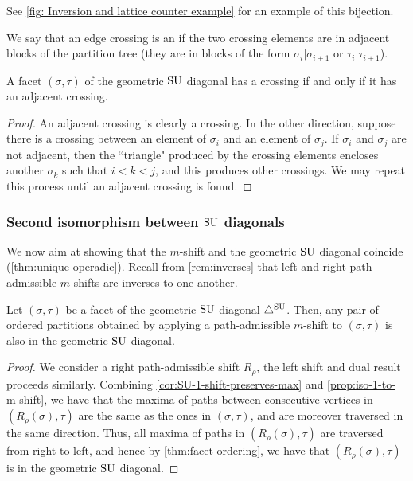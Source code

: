 See \cref{fig: Inversion and lattice counter example} for an example of this bijection.

\begin{definition}
We say that an edge crossing is an  if the two crossing elements are in adjacent blocks of the partition tree (\ie they are in blocks of the form $\sigma_i|\sigma_{i+1}$ or $\tau_i|\tau_{i+1}$).
\end{definition}

\begin{lemma}
\label{lem:adjacent-crossing}
A facet $(\sigma,\tau)$ of the geometric $\mathrm{SU}$ diagonal has a crossing if and only if it has an adjacent crossing.
\end{lemma}

\begin{proof}
An adjacent crossing is clearly a crossing. 
In the other direction, suppose there is a crossing between an element of $\sigma_i$ and an element of $\sigma_j$. 
If $\sigma_i$ and $\sigma_j$ are not adjacent, then the ``triangle" produced by the crossing elements encloses another $\sigma_k$ such that $i<k<j$, and this produces other crossings. We may repeat this process until an adjacent crossing is found.
\end{proof}




\subsubsection{Second isomorphism between $\mathrm{SU}$ diagonals}
\label{sec:Iso m-shifts to IJ}

We now aim at showing that the $m$-shift and the geometric $\mathrm{SU}$ diagonal coincide (\cref{thm:unique-operadic}).
Recall from \cref{rem:inverses} that left and right path-admissible $m$-shifts are inverses to one another. 

\begin{proposition} 
\label{lem:IJ-closed-under-shifts}
Let $(\sigma,\tau)$ be a facet of the geometric $\mathrm{SU}$ diagonal $\triangle^{\mathrm{SU}}$.
Then, any pair of ordered partitions obtained by applying a path-admissible $m$-shift to $(\sigma,\tau)$ is also in the geometric $\mathrm{SU}$ diagonal.
\end{proposition}

\begin{proof}
We consider a right path-admissible shift $R_\rho$, the left shift and dual result proceeds similarly. 
Combining \cref{cor:SU-1-shift-preserves-max} and \cref{prop:iso-1-to-m-shift}, we have that the maxima of paths between consecutive vertices in $(R_{\rho}(\sigma),\tau)$ are the same as the ones in $(\sigma,\tau)$, and are moreover traversed in the same direction.
Thus, all maxima of paths in $(R_{\rho}(\sigma),\tau)$ are traversed from right to left, and hence by \cref{thm:facet-ordering}, we have that $(R_{\rho}(\sigma),\tau)$ is in the geometric $\mathrm{SU}$ diagonal.
\end{proof}

